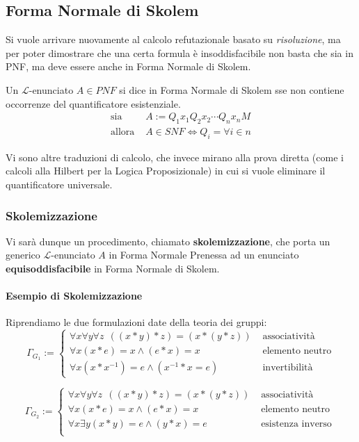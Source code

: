 \subsection{Forma Normale di Skolem}
Si vuole arrivare nuovamente al calcolo refutazionale basato su \textit{risoluzione}, ma per poter dimostrare che una certa formula è insoddisfacibile non basta che sia in PNF, ma deve essere anche in Forma Normale di Skolem. 

\begin{defi}
Un $\mathscr{L}$-enunciato $A \in PNF$ si dice in Forma Normale di Skolem sse non contiene occorrenze del quantificatore esistenziale.
\begin{align*}
\text{sia } & A := Q_1 x_1 Q_2 x_2 \cdots Q_n x_n M \\
\text{allora } &  A \in SNF \iff Q_i = \forall i \in n
\end{align*}
\end{defi}

Vi sono altre traduzioni di calcolo, che invece mirano alla prova diretta 
(come i calcoli alla Hilbert per la Logica Proposizionale) in cui si vuole 
eliminare il quantificatore universale. 

\subsubsection{Skolemizzazione}
Vi sarà dunque un procedimento, chiamato \textbf{skolemizzazione}, 
che porta un generico $\mathscr{L}$-enunciato $A$ in 
Forma Normale Prenessa ad un enunciato \textbf{equisoddisfacibile} in Forma Normale 
di Skolem.

\paragraph{Esempio di Skolemizzazione}
Riprendiamo le due formulazioni date della teoria dei gruppi: 
$$
\Gamma_{G_1} := 
  \begin{cases}
    \forall x \forall y \forall z  ~~ ((x * y) * z) = (x * (y * z))  & \text{ associatività}\\
    \forall x (x * e) = x \land (e * x) = x  & \text{ elemento neutro}\\
    \forall x (x * x^{-1}) = e \land (x^{-1} * x = e) & \text{ invertibilità}
  \end{cases}
$$

$$
        \Gamma_{G_2} := 
                \begin{cases}
                        \forall x \forall y \forall z  ~~ ((x * y) * z) = (x * (y * z)) & \text{ associatività}\\
                        \forall x (x * e) = x \land (e * x) = x & \text{ elemento neutro } \\
                        \forall x \exists y (x * y) = e \land (y * x) = e & \text{ esistenza inverso} \\
                \end{cases}
$$

